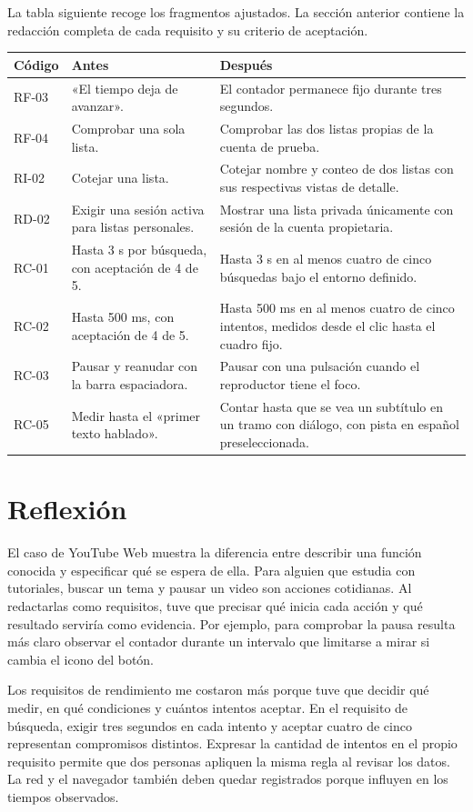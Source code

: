 \documentclass[11pt,a4paper]{article}
\begin{document}
La tabla siguiente recoge los fragmentos ajustados. La sección anterior
contiene la redacción completa de cada requisito y su criterio de aceptación.

\begin{longtable}{@{}p{.12\linewidth}p{.32\linewidth}p{.50\linewidth}@{}}
\rowcolor{gray!15} Código & Antes & Después \\
\endhead
RF-03 & «El tiempo deja de avanzar». & El contador permanece fijo durante tres segundos. \\
RF-04 & Comprobar una sola lista. & Comprobar las dos listas propias de la cuenta de prueba. \\
RI-02 & Cotejar una lista. & Cotejar nombre y conteo de dos listas con sus respectivas vistas de detalle. \\
RD-02 & Exigir una sesión activa para listas personales. & Mostrar una lista privada únicamente con sesión de la cuenta propietaria. \\
RC-01 & Hasta 3 s por búsqueda, con aceptación de 4 de 5. & Hasta 3 s en al menos cuatro de cinco búsquedas bajo el entorno definido. \\
RC-02 & Hasta 500 ms, con aceptación de 4 de 5. & Hasta 500 ms en al menos cuatro de cinco intentos, medidos desde el clic hasta el cuadro fijo. \\
RC-03 & Pausar y reanudar con la barra espaciadora. & Pausar con una pulsación cuando el reproductor tiene el foco. \\
RC-05 & Medir hasta el «primer texto hablado». & Contar hasta que se vea un subtítulo en un tramo con diálogo, con pista en español preseleccionada. \\
\end{longtable}

\section{Reflexión}
El caso de YouTube Web muestra la diferencia entre describir una función
conocida y especificar qué se espera de ella. Para alguien que estudia
con tutoriales, buscar un tema y pausar un video son acciones cotidianas.
Al redactarlas como requisitos, tuve que precisar qué inicia cada
acción y qué resultado serviría como evidencia. Por ejemplo, para
comprobar la pausa resulta más claro observar el contador durante un
intervalo que limitarse a mirar si cambia el icono del botón.

Los requisitos de rendimiento me costaron más porque tuve que decidir
qué medir, en qué condiciones y cuántos intentos aceptar. En el requisito de búsqueda, exigir tres segundos en cada
intento y aceptar cuatro de cinco representan compromisos distintos.
Expresar la cantidad de intentos en el propio requisito permite que dos
personas apliquen la misma regla al revisar los datos. La red y el
navegador también deben quedar registrados porque influyen en los tiempos
observados.
\end{document}
